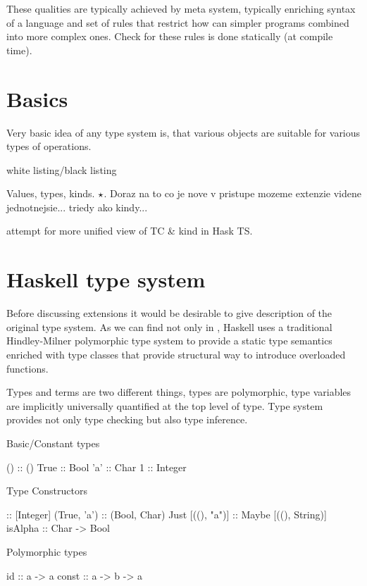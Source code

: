 \documentclass[11pt,oneside,draft]{fithesis2}
\theoremstyle{definition}
\begin{document}
These qualities are typically achieved by meta system, typically
enriching syntax of a language and set of rules that restrict how can
simpler programs combined into more complex ones.
Check for these rules is done statically (at compile time).

\section{Basics}

Very basic idea of any type system is, that various objects are
suitable for various types of operations.

white listing/black listing

Values, types, kinds. \({\star}\). Doraz na to co je nove v pristupe
mozeme extenzie videne jednotnejsie... triedy ako kindy...

attempt for more unified view of TC \& kind in Hask TS.


\section{Haskell type system}

Before discussing extensions it would be desirable to give description
of the original type system.
As we can find not only in \cite{haskell2010}, Haskell uses a traditional
Hindley-Milner polymorphic type system to provide a static type
semantics enriched with type classes that provide structural way to
introduce overloaded functions.

Types and terms are two different things, types are polymorphic,
type variables are implicitly universally quantified at the top level of type.
Type system provides not only type checking but also type inference.

Basic/Constant types
\begin{code}
()   :: ()
True :: Bool
'a'  :: Char
1    :: Integer
\end{code}

Type Constructors
\begin{code}
[1, 2, 3]        :: [Integer]
(True, 'a')      :: (Bool, Char)
Just [((), "a")] :: Maybe [((), String)]
isAlpha          :: Char -> Bool
\end{code}

Polymorphic types
\begin{code}
id    :: a -> a
const :: a -> b -> a
\end{code}
\end{document}
